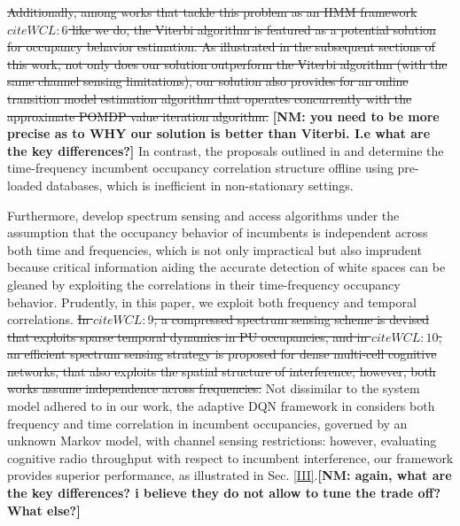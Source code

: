 \documentclass[12pt, draftcls, onecolumn]{IEEEtran}
\newcommand{\sst}[1]{\st{#1}}
\newcommand{\nm}[1]{{\color{blue}\bf{[NM: #1]}}}
\newcommand{\add}[1]{{\color{red}{#1}}}
\begin{document}
\sst{ Additionally, among works that tackle this problem as an HMM framework $cite{WCL:6}$ like we do, the Viterbi algorithm is featured as a potential solution for occupancy behavior estimation. As illustrated in the subsequent sections of this work, not only does our solution outperform the Viterbi algorithm (with the same channel sensing limitations), our solution also provides for an online transition model estimation algorithm that operates concurrently with the approximate POMDP value iteration algorithm.}
\nm{you need to be more precise as to WHY our solution is better than Viterbi. I.e what are the key differences?}
 In contrast, the proposals outlined in \cite{WCL:6} and \cite{WCL:7} determine the time-frequency incumbent occupancy correlation structure offline using pre-loaded databases, which is inefficient in non-stationary settings.

Furthermore, \cite{WCL:4, WCL:8, WCL:11,WCL:9,WCL:10} develop spectrum sensing and access algorithms under the assumption that the occupancy behavior of incumbents is independent across both time and\add{/or} frequencies, which is not only impractical but also imprudent because critical information aiding the accurate detection of white spaces can be gleaned by exploiting the correlations in their time-frequency occupancy behavior. Prudently, in this paper, we exploit both frequency and temporal correlations. \sst{In $cite{WCL:9}$, a compressed spectrum sensing scheme is devised that exploits sparse temporal dynamics in PU occupancies, and in $cite{WCL:10}$, an efficient spectrum sensing strategy is proposed for dense multi-cell cognitive networks, that also exploits the spatial structure of interference; however, both works assume independence across frequencies. }
Not dissimilar to the system model adhered to in our work, the adaptive DQN framework in \cite{WCL:DQN} considers both frequency and time correlation in incumbent occupancies, governed by an unknown Markov model, with channel sensing restrictions: however, evaluating cognitive radio throughput with respect to incumbent interference, our framework provides superior performance, as illustrated in Sec. \ref{III}.\nm{again, what are the key differences? i believe they do not allow to tune the trade off? What else?}
\end{document}

